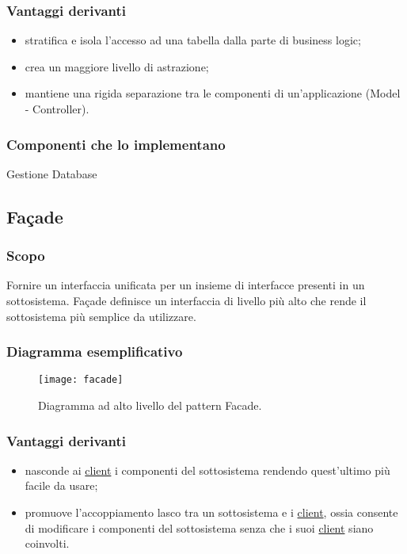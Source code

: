 \subsubsection{Vantaggi derivanti}
\begin{itemize}
\item stratifica e isola l'accesso ad una tabella dalla parte di business logic;
\item crea un maggiore livello di astrazione;
\item mantiene una rigida separazione tra le componenti di un'applicazione (Model - Controller).
\end{itemize}
\subsubsection{Componenti che lo implementano}
\item Gestione Database

\subsection{Façade}
\subsubsection{Scopo}
Fornire un interfaccia unificata per un insieme di interfacce presenti in un sottosistema. Façade definisce un interfaccia di livello più alto che rende il sottosistema più semplice da utilizzare.
\subsubsection{Diagramma esemplificativo}
\begin{figure}[h]
\centering
\texttt{[image: facade]}
\caption{Diagramma ad alto livello del pattern Facade.}\label{fig:facade}
\end{figure}
\subsubsection{Vantaggi derivanti}
\begin{itemize}
\item nasconde ai \underline{client} i componenti del sottosistema rendendo quest'ultimo più facile da usare;
\item promuove l'accoppiamento lasco tra un sottosistema e i \underline{client}, ossia consente di modificare i componenti del sottosistema senza che i suoi \underline{client} siano coinvolti.
\end{itemize}
